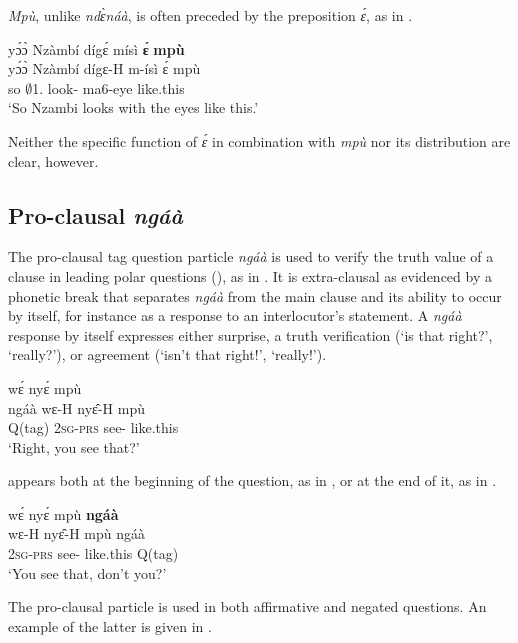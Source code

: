 {\itshape Mpù}, unlike {\itshape ndɛ̀náà}, is often preceded by the preposition {\itshape ɛ́}, as in .

\ea \label{likethis6}
  \glll yɔ́ɔ̀ Nzàmbí dígɛ́ mísì {\bfseries ɛ́} {\bfseries mpù} \\
      yɔ́ɔ̀ Nzàmbí dígɛ-H m-ísì ɛ́ mpù \\
       so $\emptyset$1.{\PN} look-{\R} ma6-eye {\LOC} like.this  \\
    \trans `So Nzambi looks with the eyes like this.'
\z

\noindent Neither the specific function of {\itshape ɛ́} in combination with {\itshape mpù} nor its distribution are clear, however. 




\subsection{Pro-clausal {\itshape ngáà}}
\label{sec:ProClause}

The pro-clausal tag question particle {\itshape ngáà} is used to verify the truth value of a clause in leading polar questions (), as in . It is extra-clausal as evidenced by a phonetic break that separates {\itshape ngáà} from the main clause and its ability to occur by itself, for instance as a response to an interlocutor's statement. A {\itshape ngáà} response by itself expresses either surprise, a truth verification (`is that right?', `really?'), or agreement (`isn't that right!', `really!').

\ea \label{Qtag1}
   wɛ́ nyɛ́ mpù \\
       ngáà wɛ-H nyɛ̂-H mpù \\
       Q(tag) 2\textsc{sg}-\textsc{prs} see-{\R} like.this  \\
    \trans `Right, you see that?'
\z

 appears both at the beginning of the question, as in , or at the end of it, as in .


\ea \label{Qtag2}
  \glll wɛ́ nyɛ́ mpù {\bfseries ngáà} \\
       wɛ-H nyɛ̂-H mpù ngáà \\
        2\textsc{sg}-\textsc{prs} see-{\R} like.this Q(tag) \\
    \trans `You see that, don't you?'
\z

The pro-clausal particle is used in both affirmative and negated questions. An example of the latter is given in .

